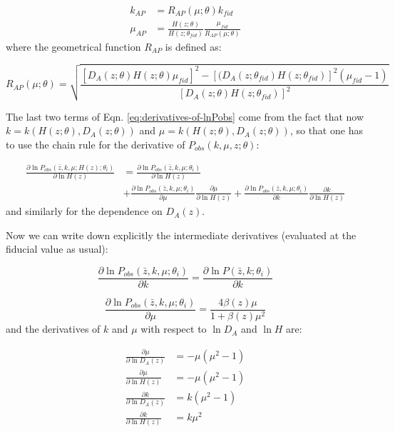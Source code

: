 \begin{align}
k_{AP} & =R_{AP}(\mu;\theta)k_{fid}\\
\mu_{AP} & =\frac{H(z;\theta)}{H(z;\theta_{fid})}\frac{\mu_{fid}}{R_{AP}(\mu;\theta)}
\end{align}
where the geometrical function $R_{AP}$ is defined as:

\begin{equation}
R_{AP}(\mu;\theta)=\sqrt{\frac{[D_{A}(z;\theta)H(z;\theta)\mu_{fid}]^{2}-[(D_{A}(z;\theta_{fid})H(z;\theta_{fid})]^{2}(\mu_{fid}-1)}{[D_{A}(z;\theta)H(z;\theta_{fid})]^{2}}}
\end{equation}


The last two terms of Eqn. \ref{eq:derivatives-of-lnPobs} come from
the fact that now $k=k(H(z;\theta),D_{A}(z;\theta))$ and $\mu=k(H(z;\theta),D_{A}(z;\theta))$,
so that one has to use the chain rule for the derivative of $P_{obs}(k,\mu,z;\theta)$:

\begin{align}
\frac{\partial\ln P_{obs}\left(\bar{z},k,\mu;H(z);\theta_{i}\right)}{\partial\ln H(z)} & =\frac{\partial\ln P_{obs}\left(\bar{z},k,\mu;\theta_{i}\right)}{\partial\ln H(z)}\\
& +\frac{\partial\ln P_{obs}\left(\bar{z},k,\mu;\theta_{i}\right)}{\partial\mu}\frac{\partial\mu}{\partial\ln H(z)}+\frac{\partial\ln P_{obs}\left(\bar{z},k,\mu;\theta_{i}\right)}{\partial k}\frac{\partial k}{\partial\ln H(z)}\nonumber 
\end{align}
and similarly for the dependence on $D_{A}(z)$.

Now we can write down explicitly the intermediate derivatives (evaluated
at the fiducial value as usual):

\begin{equation}
\frac{\partial\ln P_{obs}\left(\bar{z},k,\mu;\theta_{i}\right)}{\partial k}=\frac{\partial\ln P\left(\bar{z},k;\theta_{i}\right)}{\partial k}
\end{equation}


\begin{equation}
\frac{\partial\ln P_{obs}\left(\bar{z},k,\mu;\theta_{i}\right)}{\partial\mu}=\frac{4\beta(z)\mu}{1+\beta(z)\mu^{2}}
\end{equation}
and the derivatives of $k$ and $\mu$ with respect to $\ln D_{A}$
and $\ln H$ are:

\begin{subequations}
	
	\begin{align}
	\frac{\partial\mu}{\partial\ln D_{A}(z)} & =-\mu(\mu^{2}-1)\\
	\frac{\partial\mu}{\partial\ln H(z)} & =-\mu(\mu^{2}-1)\\
	\frac{\partial k}{\partial\ln D_{A}(z)} & =k(\mu^{2}-1)\\
	\frac{\partial k}{\partial\ln H(z)} & =k\mu^{2}
	\end{align}
	
	
	\label{eq: derivs-of-k-mu-AP}\end{subequations}

